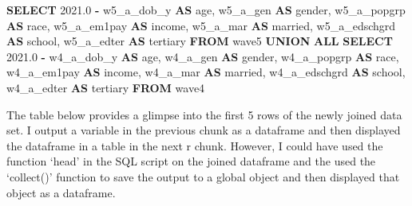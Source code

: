 \documentclass[11pt,preprint, authoryear]{elsarticle}
\numberwithin{equation}{section}
\numberwithin{figure}{section}
\numberwithin{table}{section}
\newenvironment{Shaded}{\begin{snugshade}}{\end{snugshade}}
\newcommand{\FloatTok}[1]{\textcolor[rgb]{0.00,0.00,0.81}{#1}}
\newcommand{\KeywordTok}[1]{\textcolor[rgb]{0.13,0.29,0.53}{\textbf{#1}}}
\newcommand{\NormalTok}[1]{#1}
\newcommand{\OperatorTok}[1]{\textcolor[rgb]{0.81,0.36,0.00}{\textbf{#1}}}
\begin{document}
\begin{Shaded}
\begin{Highlighting}[]
\KeywordTok{SELECT} \FloatTok{2021.0} \OperatorTok{{-}}\NormalTok{ \textasciigrave{}w5\_a\_dob\_y\textasciigrave{} }\KeywordTok{AS}\NormalTok{ \textasciigrave{}age\textasciigrave{}, \textasciigrave{}w5\_a\_gen\textasciigrave{} }\KeywordTok{AS}\NormalTok{ \textasciigrave{}gender\textasciigrave{}, }
\NormalTok{\textasciigrave{}w5\_a\_popgrp\textasciigrave{} }\KeywordTok{AS}\NormalTok{ \textasciigrave{}race\textasciigrave{}, \textasciigrave{}w5\_a\_em1pay\textasciigrave{} }\KeywordTok{AS}\NormalTok{ \textasciigrave{}income\textasciigrave{}, }
\NormalTok{\textasciigrave{}w5\_a\_mar\textasciigrave{} }\KeywordTok{AS}\NormalTok{ \textasciigrave{}married\textasciigrave{}, \textasciigrave{}w5\_a\_edschgrd\textasciigrave{} }\KeywordTok{AS}\NormalTok{ \textasciigrave{}school\textasciigrave{}, }
\NormalTok{\textasciigrave{}w5\_a\_edter\textasciigrave{} }\KeywordTok{AS}\NormalTok{ \textasciigrave{}tertiary\textasciigrave{} }\KeywordTok{FROM}\NormalTok{ \textasciigrave{}wave5\textasciigrave{}}
\KeywordTok{UNION} \KeywordTok{ALL}
\KeywordTok{SELECT} \FloatTok{2021.0} \OperatorTok{{-}}\NormalTok{ \textasciigrave{}w4\_a\_dob\_y\textasciigrave{} }\KeywordTok{AS}\NormalTok{ \textasciigrave{}age\textasciigrave{}, \textasciigrave{}w4\_a\_gen\textasciigrave{} }\KeywordTok{AS}\NormalTok{ \textasciigrave{}gender\textasciigrave{}, }
\NormalTok{\textasciigrave{}w4\_a\_popgrp\textasciigrave{} }\KeywordTok{AS}\NormalTok{ \textasciigrave{}race\textasciigrave{}, \textasciigrave{}w4\_a\_em1pay\textasciigrave{} }\KeywordTok{AS}\NormalTok{ \textasciigrave{}income\textasciigrave{}, }
\NormalTok{\textasciigrave{}w4\_a\_mar\textasciigrave{} }\KeywordTok{AS}\NormalTok{ \textasciigrave{}married\textasciigrave{}, \textasciigrave{}w4\_a\_edschgrd\textasciigrave{} }\KeywordTok{AS}\NormalTok{ \textasciigrave{}school\textasciigrave{}, }
\NormalTok{\textasciigrave{}w4\_a\_edter\textasciigrave{} }\KeywordTok{AS}\NormalTok{ \textasciigrave{}tertiary\textasciigrave{} }\KeywordTok{FROM}\NormalTok{ \textasciigrave{}wave4\textasciigrave{}}
\end{Highlighting}
\end{Shaded}

The table below provides a glimpse into the first 5 rows of the newly
joined data set. I output a variable in the previous chunk as a
dataframe and then displayed the dataframe in a table in the next r
chunk. However, I could have used the function `head' in the SQL script
on the joined dataframe and the used the `collect()' function to save
the output to a global object and then displayed that object as a
dataframe.
\end{document}
